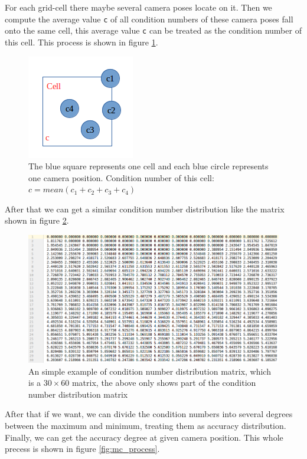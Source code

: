 For each grid-cell there maybe several camera poses locate on it. Then we compute the average value \texttt{c} of all condition numbers of these camera poses fall onto the same cell, this average value \texttt{c} can be treated as the condition number of this cell. This process is shown in figure \ref{fig:cell_cn}.

\begin{figure}[H]
\centering
\includegraphics[scale=0.8]{./fig/cell_cn.png}
\caption{The blue square represents one cell and each blue circle represents one camera position. Condition number of this cell: $c = mean(c_1 + c_2 +c_3 + c_4)$}  
\label{fig:cell_cn}
\end{figure}

After that we can get a similar condition number distribution like the matrix shown in figure \ref{fig:conditionNum_mat}.
\begin{figure}[H]
\centering
\includegraphics[scale=0.5]{./fig/conditionNum_mat.png}
\caption{An simple example of condition number distribution matrix, which is a $30 \times 60$ matrix, the above only shows part of the condition number distribution matrix}  
\label{fig:conditionNum_mat}
\end{figure}

After that if we want, we can divide the condition numbers into several degrees between the maximum and minimum, treating them as accuracy distribution. Finally, we can get the accuracy degree at given camera position. This whole precess is shown in figure \ref{fig:mc_process}.

